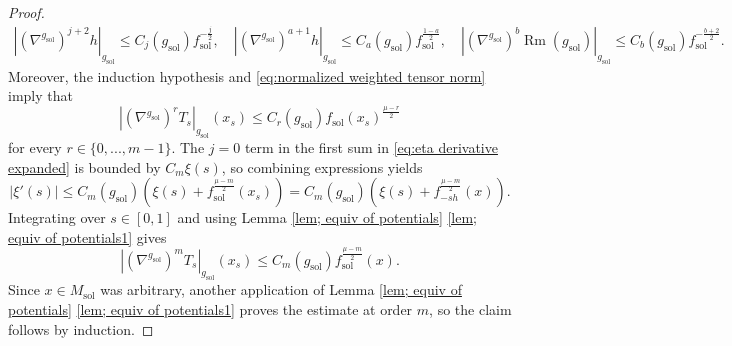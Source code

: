 \documentclass[10pt,a4paper]{amsart}
\newcommand{\Rm}{\operatorname{Rm}}
\providecommand{\sol}{\operatorname{sol}}
\begin{document}
\begin{proof}
\begin{align*}
\left|(\nabla^{g_{\sol}})^{j+2}h\right|_{g_{\sol}}
\leq
C_j(g_{\sol})f_{\sol}^{-\frac{j}{2}}, \quad 
\left|(\nabla^{g_{\sol}})^{a+1}h\right|_{g_{\sol}}
\leq
C_a(g_{\sol})f_{\sol}^{\frac{1-a}{2}}, \quad
\left|(\nabla^{g_{\sol}})^b\Rm(g_{\sol})\right|_{g_{\sol}}
\leq
C_b(g_{\sol})f_{\sol}^{-\frac{b+2}{2}}.
\end{align*}
Moreover, the induction hypothesis and
\eqref{eq:normalized weighted tensor norm} imply that
\begin{equation}\label{eq:lower derivative pullback bound}
\left|(\nabla^{g_{\sol}})^rT_s\right|_{g_{\sol}}(x_s)
\leq
C_r(g_{\sol})
f_{\sol}(x_s)^{\frac{\mu-r}{2}}
\end{equation}
for every $r\in \{0,...,m-1\}$. The $j=0$ term in the first sum in
\eqref{eq:eta derivative expanded} is bounded by $C_m\xi(s)$, so combining expressions yields
\begin{equation*}
|\xi'(s)|
\leq
C_m(g_{\sol})
\left( \xi(s) + f_{\sol}^{\frac{\mu-m}{2}}(x_s)
\right) = C_m(g_{\sol})\left( \xi(s)+f_{-sh}^{\frac{\mu-m}{2}}(x) \right).
\end{equation*}
Integrating over $s\in [0,1]$ and using Lemma
\ref{lem; equiv of potentials} \ref{lem; equiv of potentials1}
gives
\begin{equation*}
\left|(\nabla^{g_{\sol}})^mT_s\right|_{g_{\sol}}(x_s)
\leq
C_m(g_{\sol})
f_{\sol}^{\frac{\mu-m}{2}}(x).
\end{equation*}
Since $x\in M_{\sol}$ was arbitrary, another application of Lemma \ref{lem; equiv of potentials}  \ref{lem; equiv of potentials1} proves the estimate
at order $m$, so the claim follows by induction.


\end{proof}
\end{document}
